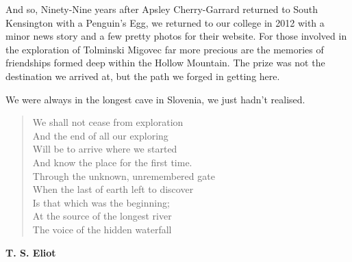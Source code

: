 And so, Ninety-Nine years after Apsley Cherry-Garrard returned to South
Kensington with a Penguin's Egg, we returned to our college in 2012 with
a minor news story and a few pretty photos for their website. For those
involved in the exploration of Tolminski Migovec far more precious are
the memories of friendships formed deep within the Hollow Mountain. The
prize was not the destination we arrived at, but the path we forged in
getting here.

We were always in the longest cave in Slovenia, we just hadn't realised.


\begin{verse}
We shall not cease from exploration  \\
And the end of all our exploring  \\
Will be to arrive where we started  \\
And know the place for the first time. 
 \\
Through the unknown, unremembered gate  \\
When the last of earth left to discover  \\
Is that which was the beginning;  \\
At the source of the longest river  \\
The voice of the hidden waterfall \\
\end{verse}

\raggedleft\normalsize\sffamily\textbf{T. S. Eliot}